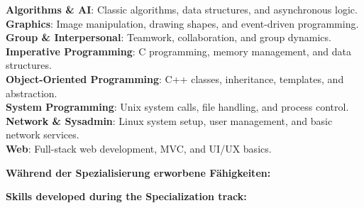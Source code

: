 \documentclass[11pt]{article}
\begin{document}
{{{{{{{{{{{{\noindent \textbf{Algorithms \& AI}: Classic algorithms, data structures, and asynchronous logic.\\
\noindent \textbf{Graphics}: Image manipulation, drawing shapes, and event-driven programming.\\
\noindent \textbf{Group \& Interpersonal}: Teamwork, collaboration, and group dynamics.\\
\noindent \textbf{Imperative Programming}: C programming, memory management, and data structures.\\
\noindent \textbf{Object-Oriented Programming}: C++ classes, inheritance, templates, and abstraction.\\
\noindent \textbf{System Programming}: Unix system calls, file handling, and process control.\\
\noindent \textbf{Network \& Sysadmin}: Linux system setup, user management, and basic network services.\\
\noindent \textbf{Web}: Full-stack web development, MVC, and UI/UX basics.\\
{%

\vspace{1.0cm}

{%

	{%
	\noindent\textbf{Während der Spezialisierung erworbene Fähigkeiten:}
	{%
	\noindent\textbf{Skills developed during the Specialization track:}
	{%

	\vspace{0.5em}

}}}}}}}}}}}}}}}}}
\end{document}

